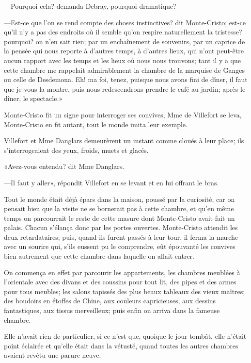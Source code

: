 —Pourquoi cela? demanda Debray, pourquoi dramatique? 

—Est-ce que l'on se rend compte des choses instinctives? dit Monte-Cristo; est-ce qu'il n'y a pas des endroits où il semble qu'on respire naturellement la tristesse? pourquoi? on n'en sait rien; par un enchaînement de souvenirs, par un caprice de la pensée qui nous reporte à d'autres temps, à d'autres lieux, qui n'ont peut-être aucun rapport avec les temps et les lieux où nous nous trouvons; tant il y a que cette chambre me rappelait admirablement la chambre de la marquise de Ganges ou celle de Desdemona. Eh! ma foi, tenez, puisque nous avons fini de dîner, il faut que je vous la montre, puis nous redescendrons prendre le café au jardin; après le dîner, le spectacle.» 

Monte-Cristo fit un signe pour interroger ses convives, Mme de Villefort se leva, Monte-Cristo en fit autant, tout le monde imita leur exemple. 

Villefort et Mme Danglars demeurèrent un instant comme cloués à leur place; ils s'interrogeaient des yeux, froids, muets et glacés. 

«Avez-vous entendu? dit Mme Danglars. 

—Il faut y aller», répondit Villefort en se levant et en lui offrant le bras.  

Tout le monde était déjà épars dans la maison, poussé par la curiosité, car on pensait bien que la visite ne se bornerait pas à cette chambre, et qu'en même temps on parcourrait le reste de cette masure dont Monte-Cristo avait fait un palais. Chacun s'élança donc par les portes ouvertes. Monte-Cristo attendit les deux retardataires; puis, quand ils furent passés à leur tour, il ferma la marche avec un sourire qui, s'ils eussent pu le comprendre, eût épouvanté les convives bien autrement que cette chambre dans laquelle on allait entrer. 

On commença en effet par parcourir les appartements, les chambres meublées à l'orientale avec des divans et des coussins pour tout lit, des pipes et des armes pour tous meubles; les salons tapissés des plus beaux tableaux des vieux maîtres; des boudoirs en étoffes de Chine, aux couleurs capricieuses, aux dessins fantastiques, aux tissus merveilleux; puis enfin on arriva dans la fameuse chambre. 

Elle n'avait rien de particulier, si ce n'est que, quoique le jour tombât, elle n'était point éclairée et qu'elle était dans la vétusté, quand toutes les autres chambres avaient revêtu une parure neuve. 

